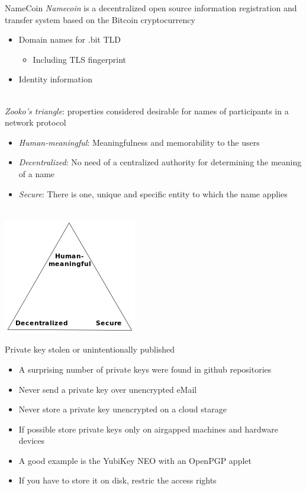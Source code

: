 \documentclass[11pt]{beamer}
\begin{document}
\begin{frame}{NameCoin}
\emph{Namecoin} is a decentralized open source information registration and transfer system based on the Bitcoin cryptocurrency
\begin{itemize}
\item Domain names for .bit TLD
\begin{itemize}
\item Including TLS fingerprint
\end{itemize}
\item Identity information 
\end{itemize}
\\[0.2cm]
\pause
\emph{Zooko's triangle}: properties considered desirable for names of participants in a network protocol
\begin{itemize}
\item \emph{Human-meaningful}: Meaningfulness and memorability to the users
\item \emph{Decentralized}: No need of a centralized authority for determining the meaning of a name
\item \emph{Secure}: There is one, unique and specific entity to which the name applies
\end{itemize}
\\[0.2cm]
\includegraphics[scale=0.2]{zooko_triangle.png}
\end{frame}

\begin{frame}{Private key stolen or unintentionally published}
\begin{itemize}
\item A surprising number of private keys were found in github repositories
\item Never send a private key over unencrypted eMail %
\item Never store a private key unencrypted on a cloud starage
\item If possible store private keys only on airgapped machines and hardware devices
\item A good example is the YubiKey NEO with an OpenPGP applet
\item If you have to store it on disk, restric the access rights
\end{itemize}
\end{frame}
\end{document}
